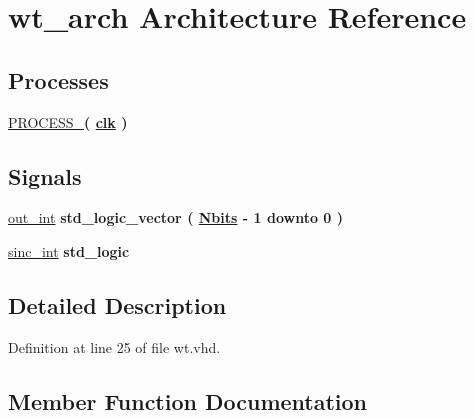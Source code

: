 \hypertarget{classwt_1_1wt__arch}{}\section{wt\+\_\+arch Architecture Reference}
\label{classwt_1_1wt__arch}
\subsection*{Processes}
 \begin{DoxyCompactItemize}
\item 
\hyperlink{classwt_1_1wt__arch_a5427232bb22991550e6168cf5171fc30}{P\+R\+O\+C\+E\+S\+S\+\_}{\bfseries  ( {\bfseries {\bfseries \hyperlink{classwt_a4a4609c199d30b3adebbeb3a01276ec5}{clk}} \textcolor{vhdlchar}{ }} )}
\end{DoxyCompactItemize}
\subsection*{Signals}
 \begin{DoxyCompactItemize}
\item 
\hyperlink{classwt_1_1wt__arch_a495e571184c4e4e4665241de22f331cc}{out\+\_\+int} {\bfseries \textcolor{comment}{std\+\_\+logic\+\_\+vector}\textcolor{vhdlchar}{ }\textcolor{vhdlchar}{(}\textcolor{vhdlchar}{ }\textcolor{vhdlchar}{ }\textcolor{vhdlchar}{ }\textcolor{vhdlchar}{ }{\bfseries \hyperlink{classwt_a8b45761acb3f2e683677c4eb77d442b0}{Nbits}} \textcolor{vhdlchar}{-\/}\textcolor{vhdlchar}{ } \textcolor{vhdldigit}{1} \textcolor{vhdlchar}{ }\textcolor{keywordflow}{downto}\textcolor{vhdlchar}{ }\textcolor{vhdlchar}{ } \textcolor{vhdldigit}{0} \textcolor{vhdlchar}{ }\textcolor{vhdlchar}{)}\textcolor{vhdlchar}{ }} 
\item 
\hyperlink{classwt_1_1wt__arch_a45126d1a75be347f440d181b7aa5e033}{sinc\+\_\+int} {\bfseries \textcolor{comment}{std\+\_\+logic}\textcolor{vhdlchar}{ }} 
\end{DoxyCompactItemize}


\subsection{Detailed Description}


Definition at line 25 of file wt.\+vhd.



\subsection{Member Function Documentation}
\hypertarget{classwt_1_1wt__arch_a5427232bb22991550e6168cf5171fc30}{}
